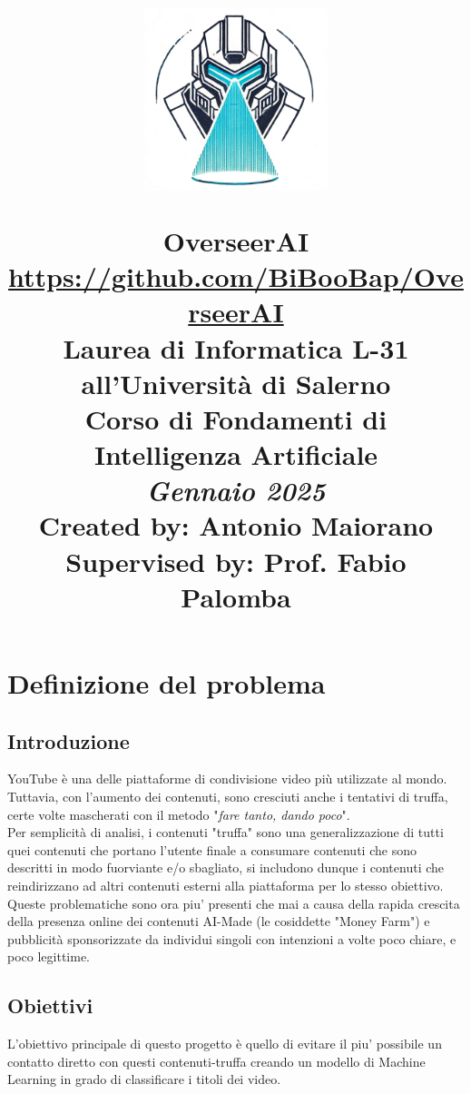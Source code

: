 \documentclass[a4paper,12pt]{report}
\title{
    \includegraphics[width=0.40\textwidth]{images/logo_overseerai.png}
    
    \textbf{\Huge OverseerAI} \\
    \href{https://github.com/BiBooBap/OverseerAI}{\small https://github.com/BiBooBap/OverseerAI}\\
    \vspace{0.5cm} %
    \large Laurea di Informatica L-31 all'Università di Salerno \\
    \large Corso di Fondamenti di Intelligenza Artificiale \\
    \vspace{0.5cm} %
    \small \textit{Gennaio 2025} \\
    \vspace{3cm}
    \textbf{Created by: }{\large Antonio Maiorano} \\
    \vspace{0.5cm}
    \textbf{Supervised by: }{\large Prof. Fabio Palomba}\\
}
\date{}
\begin{document}
\maketitle
\thispagestyle{empty}
\newpage

\renewcommand*\contentsname{\hfill Indice \hfill}
\setcounter{page}{1}  %
\tableofcontents
\newpage

\begingroup%
\makeatletter%
\let\clearpage\relax%
\vspace*{\fill}%
\vspace*{\dimexpr-50\p@-\baselineskip}%
\chapter{Definizione del problema}
\vspace*{\fill}%
\endgroup
\newpage


\section{Introduzione}
YouTube è una delle piattaforme di condivisione video più utilizzate al mondo. Tuttavia, con l'aumento dei contenuti, sono cresciuti anche i tentativi di truffa, certe volte mascherati con il metodo "\textit{fare tanto, dando poco}".\\
Per semplicità di analisi, i contenuti "truffa" sono una generalizzazione di tutti quei contenuti che portano l'utente finale a consumare contenuti che sono descritti in modo fuorviante e/o sbagliato, si includono dunque i contenuti che reindirizzano ad altri contenuti esterni alla piattaforma per lo stesso obiettivo.\\
Queste problematiche sono ora piu' presenti che mai a causa della rapida crescita della presenza online dei contenuti AI-Made (le cosiddette "Money Farm") e pubblicità sponsorizzate da individui singoli con intenzioni a volte poco chiare, e poco legittime.

\section{Obiettivi}
L'obiettivo principale di questo progetto è quello di evitare il piu' possibile un contatto diretto con questi contenuti-truffa creando un modello di Machine Learning in grado di classificare i titoli dei video.
\end{document}
